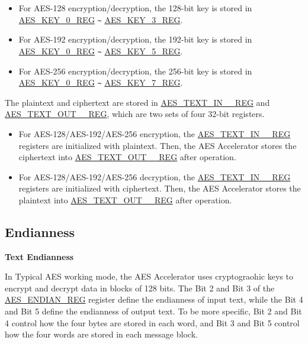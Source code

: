 \documentclass[main\_\_EN.tex]{subfiles}
\begin{document}
\begin{itemize}
    \item For AES-128 encryption/decryption, the 128-bit key is stored in \hyperref[regdesc:AESKEYnREG]{AES\_KEY\_0\_REG} \verb+~+ \hyperref[regdesc:AESKEYnREG]{AES\_KEY\_3\_REG}.
    \item For AES-192 encryption/decryption, the 192-bit key is stored in \hyperref[regdesc:AESKEYnREG]{AES\_KEY\_0\_REG} \verb+~+ \hyperref[regdesc:AESKEYnREG]{AES\_KEY\_5\_REG}.
    \item For AES-256 encryption/decryption, the 256-bit key is stored in \hyperref[regdesc:AESKEYnREG]{AES\_KEY\_0\_REG} \verb+~+ \hyperref[regdesc:AESKEYnREG]{AES\_KEY\_7\_REG}.
\end{itemize}

The plaintext and ciphertext are stored in \hyperref[regdesc:AESTEXTINnREG]{AES\_TEXT\_IN\_\_REG} and \hyperref[regdesc:AESTEXTOUTnREG]{AES\_TEXT\_OUT\_\_REG}, which are two sets of four 32-bit registers.

\begin{itemize}
    \item For AES-128/AES-192/AES-256 encryption, the \hyperref[regdesc:AESTEXTINnREG]{AES\_TEXT\_IN\_\_REG} registers are initialized with plaintext. Then, the AES Accelerator stores the ciphertext into \hyperref[regdesc:AESTEXTOUTnREG]{AES\_TEXT\_OUT\_\_REG} after operation.
    \item For AES-128/AES-192/AES-256 decryption, the \hyperref[regdesc:AESTEXTINnREG]{AES\_TEXT\_IN\_\_REG} registers are initialized with ciphertext. Then, the AES Accelerator stores the plaintext into \hyperref[regdesc:AESTEXTOUTnREG]{AES\_TEXT\_OUT\_\_REG} after operation.
\end{itemize}


\subsection{Endianness}

\textbf{Text Endianness}

In Typical AES working mode, the AES Accelerator uses cryptograohic keys to encrypt and decrypt data in blocks of 128 bits. The Bit 2 and Bit 3 of the \hyperref[regdesc:AESENDIANREG]{AES\_ENDIAN\_REG} register define the endianness of input text, while the Bit 4 and Bit 5 define the endianness of output text. To be more specific, Bit 2 and Bit 4 control how the four bytes are stored in each word, and Bit 3 and Bit 5 control how the four words are stored in each message block.
\end{document}
